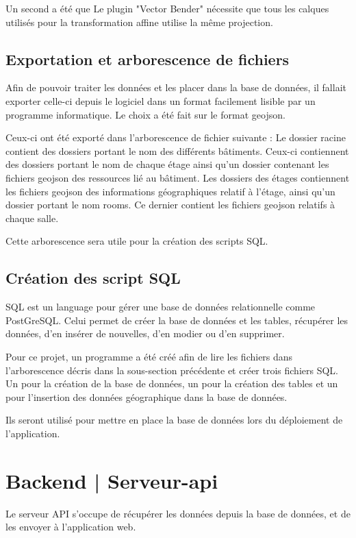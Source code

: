 \documentclass[
    iai, %
    il, %
]{heig-tb}
\begin{document}
Un second a été que Le plugin "Vector Bender" nécessite que tous les calques utilisés pour la transformation affine utilise la même projection.

\subsection{Exportation et arborescence de fichiers}
Afin de pouvoir traiter les données et les placer dans la base de données,
il fallait exporter celle-ci depuis le logiciel dans un format facilement lisible par un programme informatique.
Le choix a été fait sur le format \gls{geojson}.

Ceux-ci ont été exporté dans l'arborescence de fichier suivante :
Le dossier racine contient des dossiers portant le nom des différents bâtiments.
Ceux-ci contiennent des dossiers portant le nom de chaque étage ainsi qu'un dossier contenant les fichiers \gls{geojson} des ressources lié au bâtiment.
Les dossiers des étages contiennent les fichiers \gls{geojson} des informations géographiques relatif à l'étage, ainsi qu'un dossier portant le nom rooms.
Ce dernier contient les fichiers \gls{geojson} relatifs à chaque salle.

Cette arborescence sera utile pour la création des scripts SQL.

\subsection{Création des script SQL}
SQL est un language pour gérer une base de données relationnelle comme PostGreSQL.
Celui permet de créer la base de données et les tables, récupérer les données, d'en insérer de nouvelles, d'en modier ou d'en supprimer.

Pour ce projet, un programme  a été créé afin de lire les fichiers dans l'arborescence décris dans la sous-section précédente
et créer trois fichiers SQL. Un pour la création de la base de données, un pour la création des tables et un pour l'insertion des données géographique dans la base de données.

Ils seront utilisé pour mettre en place la base de données lors du déploiement de l'application.

\section{Backend | Serveur-api}
Le serveur API s'occupe de récupérer les données depuis la base de données, et de les envoyer à l'application web.
\end{document}
